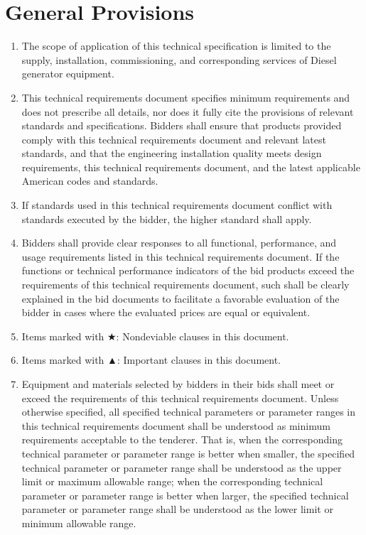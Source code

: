 \documentclass[a4paper,10pt,english,openany,oneside]{sphinxmanual}
\begin{document}
\chapter{General Provisions}
\label{\detokenize{section1_general:general-provisions}}\label{\detokenize{section1_general::doc}}\begin{enumerate}
%
\item {} 
\sphinxAtStartPar
The scope of application of this technical specification is limited to the supply, installation, commissioning, and corresponding services of Diesel generator equipment.

\item {} 
\sphinxAtStartPar
This technical requirements document specifies minimum requirements and does not prescribe all details, nor does it fully cite the provisions of relevant standards and specifications. Bidders shall ensure that products provided comply with this technical requirements document and relevant latest standards, and that the engineering installation quality meets design requirements, this technical requirements document, and the latest applicable American codes and standards.

\item {} 
\sphinxAtStartPar
If standards used in this technical requirements document conflict with standards executed by the bidder, the higher standard shall apply.

\item {} 
\sphinxAtStartPar
Bidders shall provide clear responses to all functional, performance, and usage requirements listed in this technical requirements document. If the functions or technical performance indicators of the bid products exceed the requirements of this technical requirements document, such shall be clearly explained in the bid documents to facilitate a favorable evaluation of the bidder in cases where the evaluated prices are equal or equivalent.

\item {} 
\sphinxAtStartPar
Items marked with ★: Non\sphinxhyphen{}deviable clauses in this document.

\item {} 
\sphinxAtStartPar
Items marked with ▲: Important clauses in this document.

\item {} 
\sphinxAtStartPar
Equipment and materials selected by bidders in their bids shall meet or exceed the requirements of this technical requirements document. Unless otherwise specified, all specified technical parameters or parameter ranges in this technical requirements document shall be understood as minimum requirements acceptable to the tenderer. That is, when the corresponding technical parameter or parameter range is better when smaller, the specified technical parameter or parameter range shall be understood as the upper limit or maximum allowable range; when the corresponding technical parameter or parameter range is better when larger, the specified technical parameter or parameter range shall be understood as the lower limit or minimum allowable range.


\end{enumerate}
\end{document}
